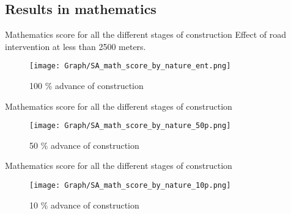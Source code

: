 \documentclass[9pt]{beamer}
\begin{document}
 
 


\subsection{Results in mathematics}

\begin{frame}{Mathematics score for all the different stages of construction} 
\label{math100p}
Effect of road intervention at less than 2500 meters.
    \begin{figure}
      \centering
      \texttt{[image: Graph/SA\_math\_score\_by\_nature\_ent.png]} 
      \caption{\small 100 \% advance of construction  }
      \label{fig:6.1sub-first}
    \end{figure}
\end{frame}

\begin{frame}{Mathematics score for all the different stages of construction}
    \begin{figure}
      \centering
      \texttt{[image: Graph/SA\_math\_score\_by\_nature\_50p.png]} 
      \caption{\small 50 \% advance of construction  }
      \label{fig:6.1sub-first}
    \end{figure}
\end{frame}

\begin{frame}{Mathematics score for all the different stages of construction}
    \begin{figure}
      \centering
      \texttt{[image: Graph/SA\_math\_score\_by\_nature\_10p.png]} 
      \caption{\small 10 \% advance of construction 
       \hyperlink{result_math}{ } }
      \label{fig:6.1sub-first}
    \end{figure}
\end{frame}

\end{document}
